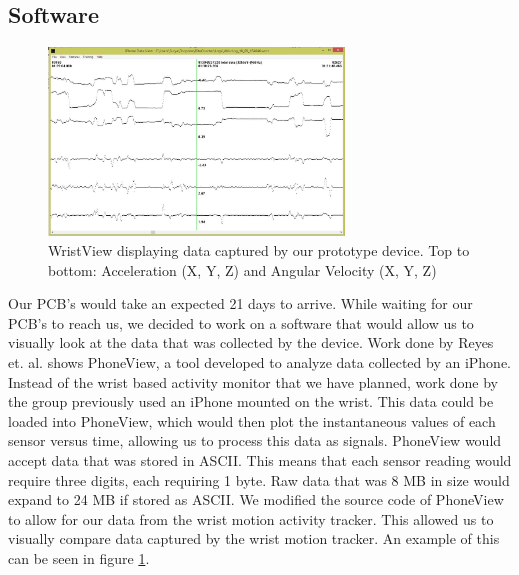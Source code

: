 \subsection{Software}
\label{Sec:Software}
\begin{figure}
\begin{center}
\includegraphics[width=0.7\textwidth]{images/WristView.jpg}
\caption{WristView displaying data captured by our prototype device. Top to bottom: Acceleration (X, Y, Z) and Angular Velocity (X, Y, Z)}
\label{Fig:WristView}
\end{center}
\end{figure}
Our PCB's would take an expected 21 days to arrive. While waiting for our PCB's to reach us,
we decided to work on a software that would allow us to visually look at the data that was collected by the device.
Work done by Reyes et. al. \cite{concha2014study} shows PhoneView,
a tool developed to analyze data collected by an iPhone.
Instead of the wrist based activity monitor that we have planned,
work done by the group previously used an iPhone mounted on the wrist.
This data could be loaded into PhoneView,
which would then plot the instantaneous values of each sensor versus time,
allowing us to process this data as signals.
PhoneView would accept data that was stored in ASCII.
This means that each sensor reading would require three digits,
each requiring 1 byte.
Raw data that was 8 MB in size would expand to 24 MB if stored as ASCII.
We modified the source code of PhoneView to allow for our data from the wrist motion activity tracker.
This allowed us to visually compare data captured by the wrist motion tracker.
An example of this can be seen in figure \ref{Fig:WristView}.

